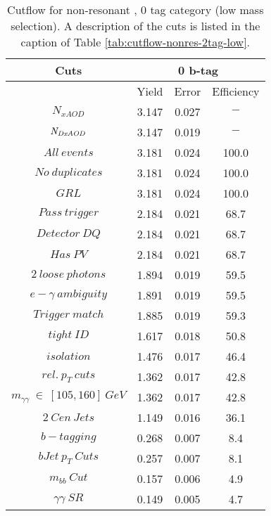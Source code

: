 \begin{table}\footnotesize
\begin{center}
\caption{Cutflow for non-resonant \hhyybb, 0 tag category (low mass selection). A description of the cuts is listed in the caption of Table \ref{tab:cutflow-nonres-2tag-low}.}

\begin{tabular}{|c|c|c|c|}
\hline
Cuts& \multicolumn{3}{c|}{0 b-tag} \\ \hline
&Yield&Error&Efficiency\\ \hline
$N_{xAOD}$ & 3.147&0.027 &$-$ \\
\hline
$\it{N}_{DxAOD}$ & 3.147&0.019 &$-$ \\
\hline
$All\ events$ & 3.181&0.024 &100.0 \\
\hline
$No\ duplicates$ & 3.181&0.024 &100.0 \\
\hline
$GRL$ & 3.181&0.024 &100.0 \\
\hline
$Pass\ trigger$ & 2.184&0.021 &68.7 \\
\hline
$Detector\ DQ$ & 2.184&0.021 &68.7 \\
\hline
$Has\ PV$ & 2.184&0.021 &68.7 \\
\hline
$2\ loose\ photons$ & 1.894&0.019 &59.5 \\
\hline
$e-\gamma\ ambiguity$ & 1.891&0.019 &59.5 \\
\hline
$Trigger\ match$ & 1.885&0.019 &59.3 \\
\hline
$tight\ ID$ & 1.617&0.018 &50.8 \\
\hline
$isolation$ & 1.476&0.017 &46.4 \\
\hline
$rel.\ p_{T}\ cuts$ & 1.362&0.017 &42.8 \\
\hline
$m_{\gamma\gamma}\ \in\ [105,160]\ GeV$ & 1.362&0.017 &42.8 \\
\hline
$2\ Cen\ Jets$ & 1.149&0.016 &36.1 \\
\hline
$b-tagging$ & 0.268&0.007 & 8.4 \\
\hline
$bJet\ p_{T}\ Cuts$ & 0.257&0.007 & 8.1 \\
\hline
$m_{bb}\ Cut$ & 0.157&0.006 & 4.9 \\
\hline
$\gamma\gamma\ SR$ & 0.149&0.005 & 4.7 \\
\hline
\end{tabular}
\end{center}
\end{table}
